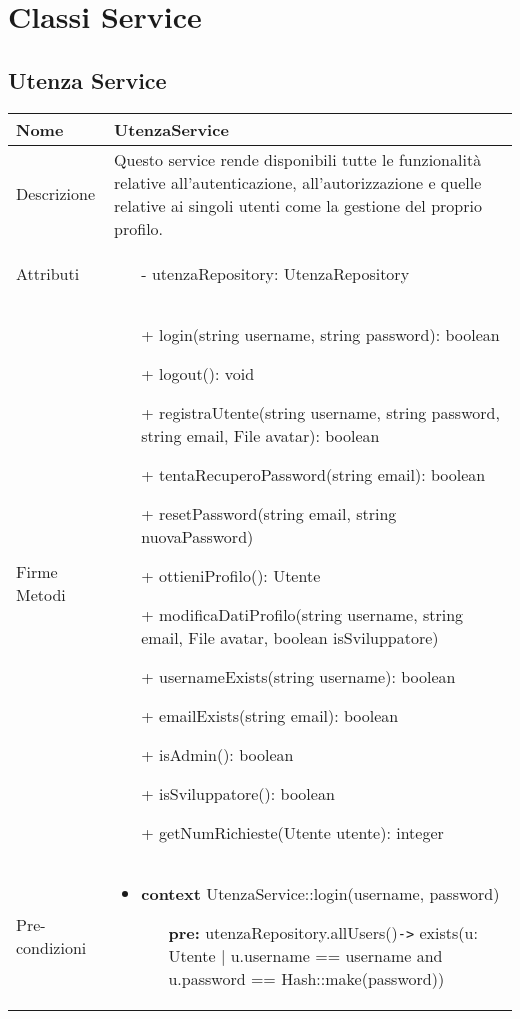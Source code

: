 \newpage
\section{Classi Service}
\subsection{Utenza Service}
\small\begin{tabular}{|| l | p{34em} ||} 
	\hline
	Nome & UtenzaService\\
	\hline
	Descrizione & Questo service rende disponibili tutte le funzionalità relative all'autenticazione, all'autorizzazione e quelle relative ai singoli utenti come la gestione del proprio profilo. \\
	\hline
	Attributi & \begin{itemize}
		\item[-] utenzaRepository: UtenzaRepository
	\end{itemize}\\
	\hline
	Firme Metodi & \begin{itemize}
		\item[+] login(string username, string password): boolean
		\item[+] logout(): void
		\item[+] registraUtente(string username, string password, string email, File avatar): boolean
		\item[+] tentaRecuperoPassword(string email): boolean
		\item[+] resetPassword(string email, string nuovaPassword)
		\item[+] ottieniProfilo(): Utente
		\item[+] modificaDatiProfilo(string username, string email, File avatar, boolean isSviluppatore)
		\item[+] usernameExists(string username): boolean
		\item[+] emailExists(string email): boolean
		\item[+] isAdmin(): boolean 
		\item[+] isSviluppatore(): boolean 
		\item[+] getNumRichieste(Utente utente): integer 
	\end{itemize}\\
	\hline
Pre-condizioni & \begin{itemize}[leftmargin=*]
	\item \textbf{context} UtenzaService::login(username, password)
	\begin{itemize}
		\item[ ] \textbf{pre:} utenzaRepository.allUsers()\verb|->| exists(u: Utente $|$ u.username == username and u.password == Hash::make(password))
	\end{itemize}


\end{itemize}
\end{tabular}
